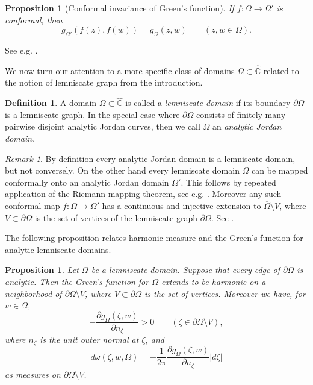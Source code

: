 \documentclass{amsart}
\theoremstyle{plain}
\newtheorem{proposition}[theorem]{Proposition}
\theoremstyle{definition}
\newtheorem{definition}[theorem]{Definition}
\theoremstyle{remark}
\newtheorem*{remark}{Remark}
\newcommand{\hC}{\widehat{\mathbb{C}}}
\begin{document}
\begin{proposition}[Conformal invariance of Green's function]
If $f:\Omega \to \Omega'$ is conformal, then
$$g_{\Omega'}(f(z),f(w)) = g_\Omega(z,w) \qquad (z,w \in \Omega).$$
\end{proposition}
See e.g. \cite[Theorem 4.4.4]{Ransford1995}.





We now turn our attention to a more specific class of domains $\Omega \subset \hC$ related to the notion of lemniscate graph from the introduction.

\begin{definition}
\label{lemniscatedomain}
A domain $\Omega \subset \hC$ is called a \textit{lemniscate domain} if its boundary $\partial \Omega$ is a lemniscate graph. In the special case where $\partial \Omega$ consists of finitely many pairwise disjoint analytic Jordan curves, then we call $\Omega$ an \textit{analytic Jordan domain}.
\end{definition}


\begin{remark}
By definition every analytic Jordan domain is a lemniscate domain, but not conversely. On the other hand every lemniscate domain $\Omega$ can be mapped conformally onto an analytic Jordan domain $\Omega'$. This follows by repeated application of the Riemann mapping theorem, see e.g. \cite[Chapter 15, Theorem 2.1]{Conway1995}. Moreover any such conformal map $f:\Omega \to \Omega'$ has a continuous and injective extension to $\overline{\Omega} \setminus V$, where $V \subset \partial \Omega$ is the set of vertices of the lemniscate graph $\partial \Omega$. See \cite[Chapter 15, Theorem 3.6]{Conway1995}.
\end{remark}

The following proposition relates harmonic measure and the Green's function for analytic lemniscate domains.

\begin{proposition}
\label{extension}
Let $\Omega$ be a lemniscate domain. Suppose that every edge of $\partial \Omega$ is analytic. Then the Green's function for $\Omega$ extends to be harmonic on a neighborhood of $\partial \Omega \setminus V$, where $V \subset \partial \Omega$ is the set of vertices. Moreover we have, for $w \in \Omega$,
$$-\frac{\partial g_\Omega (\zeta , w )}{\partial n_\zeta} > 0 \qquad (\zeta \in \partial \Omega \setminus V),$$
where $n_\zeta$ is the unit outer normal at $\zeta$, and
$$d\omega(\zeta,w,\Omega) = -\frac{1}{2\pi} \frac{\partial g_\Omega (\zeta , w)}{\partial n_\zeta} |d\zeta|$$
as measures on $\partial \Omega \setminus V$.
\end{proposition}
\end{document}
